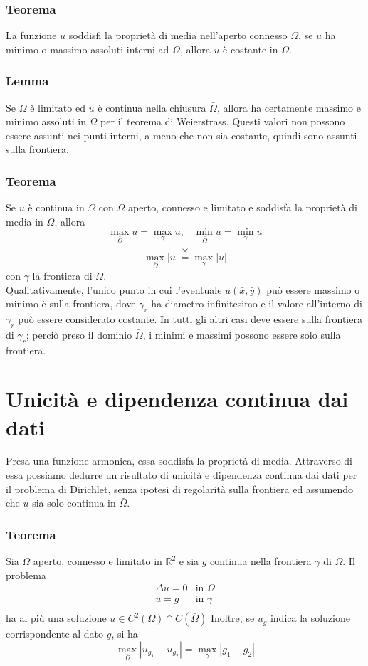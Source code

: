 \subsubsection{Teorema}
La funzione $u$ soddisfi la propriet\`a di media nell'aperto connesso $\Omega$.
se $u$ ha minimo o massimo assoluti interni ad $\Omega$, allora $u$ \`e costante
in $\Omega$.
\subsubsection{Lemma}
Se $\Omega$ \`e limitato ed $u$ \`e continua nella chiusura $\bar{\Omega}$,
allora ha certamente massimo e minimo assoluti in $\bar{\Omega}$ per il 
teorema di Weierstrass. Questi valori non possono essere assunti nei punti
interni, a meno che non sia costante, quindi sono assunti sulla frontiera.

\subsubsection{Teorema}
Se $u$ \`e continua in $\bar{\Omega}$ con $\Omega$ aperto, connesso e limitato
e soddisfa la propriet\`a di media in $\Omega$, allora
\[
	\max_{\bar{\Omega}} u= \max_{\gamma} u, \;\;\;
	\min_{\bar{\Omega}} u= \min_{\gamma} u
\]
\[
	\Downarrow
\]
\[
	\max_{\bar{\Omega}} |u|= \max_{\gamma} |u|
\]
con $\gamma$ la frontiera di $\Omega$.\\
Qualitativamente, l'unico punto in cui l'eventuale $u(\bar{x}, \bar{y})$ pu\`o 
essere massimo o minimo \`e sulla frontiera, dove $\gamma_r$ ha diametro 
infinitesimo e il valore all'interno di $\gamma_r$ pu\`o essere considerato
costante. In tutti gli altri casi deve essere sulla frontiera di $\gamma_r$; 
perci\`o preso il dominio $\bar{\Omega}$, i minimi e massimi possono essere solo sulla frontiera.
\section{Unicit\`a e dipendenza continua dai dati}
Presa una funzione armonica, essa soddisfa la propriet\`a di media.
Attraverso di essa possiamo dedurre un risultato di unicit\`a e dipendenza
continua dai dati per il problema di Dirichlet, senza ipotesi di regolarit\`a
sulla frontiera ed assumendo che $u$ sia solo continua in $\bar{\Omega}$.
\subsubsection{Teorema}
Sia $\Omega$ aperto, connesso e limitato in $\mathbb{R}^2$ e sia $g$ continua
nella frontiera $\gamma$ di $\Omega$.
Il problema
\[
	\begin{array}{ll}
		\Delta u= 0 & \text{in }\Omega \\
		u= g & \text{in }\gamma \\
	\end{array}
\]
ha al pi\`u una soluzione $u \in C^2 (\Omega) \cap C(\bar{\Omega})$
Inoltre, se $u_g$ indica la soluzione corrispondente al dato $g$, si ha
\[
	\max_{\bar{\Omega}} \left| u_{g_1} - u_{g_2} \right|=
	\max_{\gamma} \left| g_1 - g_2 \right|
\]
